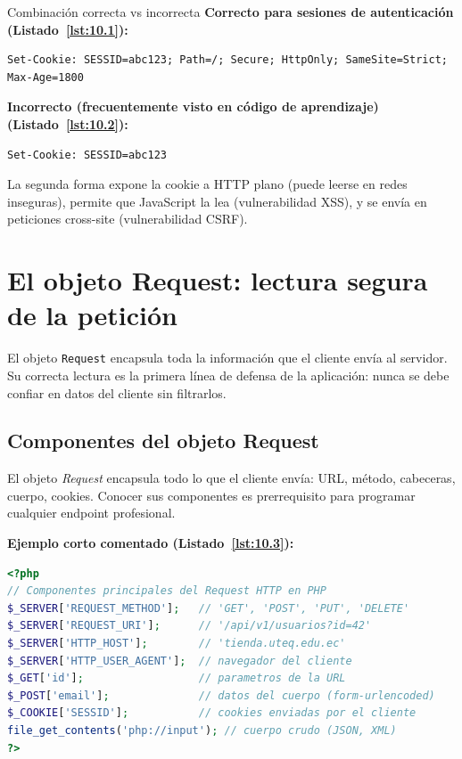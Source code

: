 \documentclass[11pt,a4paper,openany]{book}
\begin{document}
\begin{cajaadvertencia}{Combinación correcta vs incorrecta}
\textbf{Correcto para sesiones de autenticación (Listado~\ref{lst:10.1}):}
\begin{lstlisting}[style=shell,numbers=none,caption={Ejemplo de Shell},label=lst:10.1]
Set-Cookie: SESSID=abc123; Path=/; Secure; HttpOnly; SameSite=Strict; Max-Age=1800
\end{lstlisting}
\textbf{Incorrecto (frecuentemente visto en código de aprendizaje) (Listado~\ref{lst:10.2}):}
\begin{lstlisting}[style=shell,numbers=none,caption={Ejemplo de Shell},label=lst:10.2]
Set-Cookie: SESSID=abc123
\end{lstlisting}
La segunda forma expone la cookie a HTTP plano (puede leerse en redes
inseguras), permite que JavaScript la lea (vulnerabilidad XSS), y se
envía en peticiones cross-site (vulnerabilidad CSRF).
\end{cajaadvertencia}

\section{El objeto Request: lectura segura de la petición}

El objeto \texttt{Request} encapsula toda la información que el
cliente envía al servidor. Su correcta lectura es la primera línea de
defensa de la aplicación: nunca se debe confiar en datos del cliente
sin filtrarlos.

\subsection{Componentes del objeto Request}

El objeto \emph{Request} encapsula todo lo que el cliente
envía: URL, método, cabeceras, cuerpo, cookies. Conocer sus
componentes es prerrequisito para programar cualquier endpoint
profesional.

\textbf{Ejemplo corto comentado (Listado~\ref{lst:10.3}):}
\begin{lstlisting}[language=PHP,numbers=none,caption={Ejemplo de PHP},label=lst:10.3]
<?php
// Componentes principales del Request HTTP en PHP
$_SERVER['REQUEST_METHOD'];   // 'GET', 'POST', 'PUT', 'DELETE'
$_SERVER['REQUEST_URI'];      // '/api/v1/usuarios?id=42'
$_SERVER['HTTP_HOST'];        // 'tienda.uteq.edu.ec'
$_SERVER['HTTP_USER_AGENT'];  // navegador del cliente
$_GET['id'];                  // parametros de la URL
$_POST['email'];              // datos del cuerpo (form-urlencoded)
$_COOKIE['SESSID'];           // cookies enviadas por el cliente
file_get_contents('php://input'); // cuerpo crudo (JSON, XML)
?>
\end{lstlisting}
\end{document}
